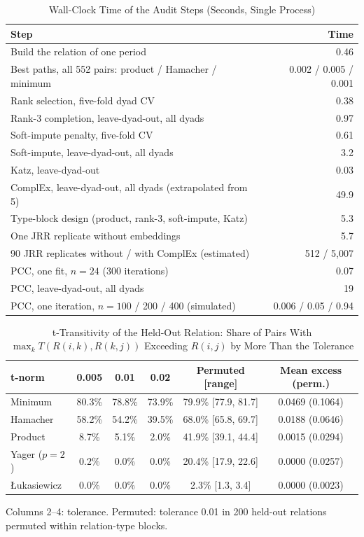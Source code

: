 \documentclass[journal]{IEEEtran}
\begin{document}
\setcounter{table}{21}\begin{table}[!t]
\caption{Wall-Clock Time of the Audit Steps (Seconds, Single Process)}
\centering
\scriptsize
\begin{tabular}{@{}l r@{}}
\toprule
Step & Time\\
\midrule
Build the relation of one period & 0.46\\
Best paths, all 552 pairs: product / Hamacher / minimum & 0.002 / 0.005 / 0.001\\
Rank selection, five-fold dyad CV & 0.38\\
Rank-3 completion, leave-dyad-out, all dyads & 0.97\\
Soft-impute penalty, five-fold CV & 0.61\\
Soft-impute, leave-dyad-out, all dyads & 3.2\\
Katz, leave-dyad-out & 0.03\\
ComplEx, leave-dyad-out, all dyads (extrapolated from 5) & 49.9\\
Type-block design (product, rank-3, soft-impute, Katz) & 5.3\\
One JRR replicate without embeddings & 5.7\\
90 JRR replicates without / with ComplEx (estimated) & 512 / 5,007\\
PCC, one fit, $n=24$ (300 iterations) & 0.07\\
PCC, leave-dyad-out, all dyads & 19\\
PCC, one iteration, $n=100$ / 200 / 400 (simulated) & 0.006 / 0.05 / 0.94\\
\bottomrule
\end{tabular}
\end{table}

\setcounter{table}{22}\begin{table}[!t]
\caption{t-Transitivity of the Held-Out Relation: Share of Pairs With $\max_kT(R(i,k),R(k,j))$ Exceeding $R(i,j)$ by More Than the Tolerance}
\centering
\scriptsize
\setlength{\tabcolsep}{2.5pt}
\begin{tabular}{@{}l c c c c c@{}}
\toprule
t-norm & 0.005 & 0.01 & 0.02 & Permuted [range] & Mean excess (perm.)\\
\midrule
Minimum & 80.3\% & 78.8\% & 73.9\% & 79.9\% [77.9, 81.7] & 0.0469 (0.1064)\\
Hamacher & 58.2\% & 54.2\% & 39.5\% & 68.0\% [65.8, 69.7] & 0.0188 (0.0646)\\
Product & 8.7\% & 5.1\% & 2.0\% & 41.9\% [39.1, 44.4] & 0.0015 (0.0294)\\
Yager ($p=2$) & 0.2\% & 0.0\% & 0.0\% & 20.4\% [17.9, 22.6] & 0.0000 (0.0257)\\
{\L}ukasiewicz & 0.0\% & 0.0\% & 0.0\% & 2.3\% [1.3, 3.4] & 0.0000 (0.0023)\\
\bottomrule
\end{tabular}

\smallskip
\parbox{\columnwidth}{\scriptsize Columns 2--4: tolerance. Permuted: tolerance 0.01 in 200 held-out relations permuted within relation-type blocks.}
\end{table}
\end{document}

